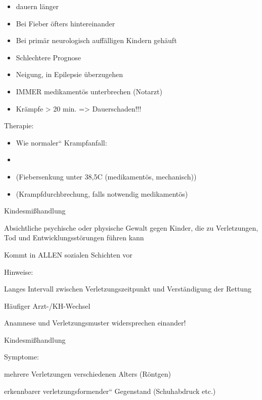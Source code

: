 \documentclass{article}
\begin{document}
\begin{itemize}
\item dauern l\"anger

\item Bei Fieber \"ofters hintereinander

\item Bei prim\"ar neurologisch auff\"alligen Kindern  geh\"auft

\item Schlechtere Prognose

\item Neigung, in Epilepsie \"uberzugehen

\item IMMER medikament\"os unterbrechen  (Notarzt)

\item Kr\"ampfe {\textgreater} 20 min. ={\textgreater} Dauerschaden!!! 

\end{itemize}
Therapie:

\begin{itemize}
\item Wie {\quotedblbase}normaler{\textquotedblleft} Krampfanfall:

\item \item (Fiebersenkung unter  38,5{\textdegree}C (medikament\"os, 
mechanisch))

\item (Krampfdurchbrechung, falls notwendig  medikament\"os)

\end{itemize}
Kindesmi{\ss}handlung

Absichtliche psychische oder physische  Gewalt gegen Kinder, die zu 
Verletzungen, Tod und  Entwicklungsst\"orungen f\"uhren kann

Kommt in ALLEN sozialen Schichten vor

Hinweise:

Langes Intervall zwischen  Verletzungszeitpunkt und Verst\"andigung der 
Rettung

H\"aufiger Arzt-/KH-Wechsel

Anamnese und Verletzungsmuster  widersprechen einander!

Kindesmi{\ss}handlung

Symptome:

mehrere Verletzungen verschiedenen Alters  (R\"ontgen)

erkennbarer {\quotedblbase}verletzungsformender{\textquotedblleft} 
Gegenstand (Schuhabdruck etc.)
\end{document}
